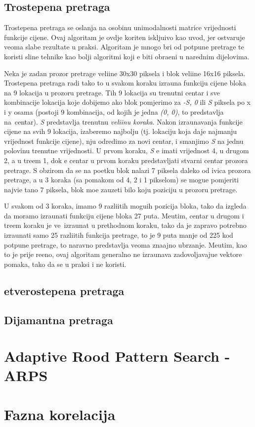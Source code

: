 \subsection{Trostepena pretraga}
Trostepena pretraga se oslanja na osobinu unimodalnosti matrice vrijednosti funkcije cijene. Ovaj algoritam je ovdje kori\sh ten isklju\ch ivo kao uvod, jer ostvaruje veoma slabe rezultate u praksi. Algoritam je mnogo br\zh i
od potpune pretrage te koristi sli\ch ne tehnike kao bolji algoritmi koji \cj e biti obra\dj eni u narednim dijelovima.

Neka je zadan prozor pretrage veli\ch ine 30x30 piksela i blok veli\ch ine 16x16 piksela. Trostepena pretraga radi tako \sh to u svakom koraku izra\ch una funkciju cijene bloka na 9 lokacija u prozoru pretrage. Tih 9 lokacija su
trenutni centar i sve kombinacije lokacija koje dobijemo ako blok pomjerimo za \textit{-S, 0} ili \textit{S} piksela po x i y osama (postoji 9 kombinacija, od kojih je jedna \textit{(0, 0)}, \sh to predstavlja na\sh\ centar).
\textit{S} predstavlja trenutnu \textit{veli\ch inu koraka}. Nakon izra\ch unavanja funkcije cijene na svih 9 lokacija, izaberemo najbolju (tj. lokaciju koja daje najmanju vrijednost funkcije cijene), nju odredimo za novi centar, i 
smanjimo \textit{S} na jednu polovinu trenutne vrijednosti. U prvom koraku, \textit{S} \cj e imati vrijednost 4, u drugom 2, a u tre\cj em 1, dok \cj e centar u prvom koraku predstavljati stvarni centar prozora pretrage. 
S obzirom da se na po\ch etku blok nalazi 7 piksela daleko od ivica prozora pretrage, a u 3 koraka (sa pomakom od 4, 2 i 1 pikselom) se mogu\cj e pomjeriti najvi\sh e ta\ch no 7 piksela, blok mo\zh e zauzeti bilo koju 
poziciju u prozoru pretrage.

U svakom od 3 koraka, imamo 9 razli\ch itih mogu\cj ih pozicija bloka, tako da izgleda da moramo izra\ch unati funkciju cijene bloka 27 puta. Me\dj utim, centar u drugom i tre\cj em koraku je ve\cj\ izra\ch unat u prethodnom
koraku, tako da je zapravo potrebno izra\ch unati samo 25 razli\ch itih funkcija pretrage, \sh to je 9 puta manje od 225 kod potpune pretrage, \sh to naravno predstavlja veoma zna\ch ajno ubrzanje. Me\dj utim, kao \sh to je
prije re\ch eno, ovaj algoritam generalno ne izra\ch unava zadovoljavaju\cj e vektore pomaka, tako da se u praksi i ne koristi.

\subsection{\CH etverostepena pretraga}

\subsection{Dijamantna pretraga}

\section{Adaptive Rood Pattern Search - ARPS}

\section{Fazna korelacija}